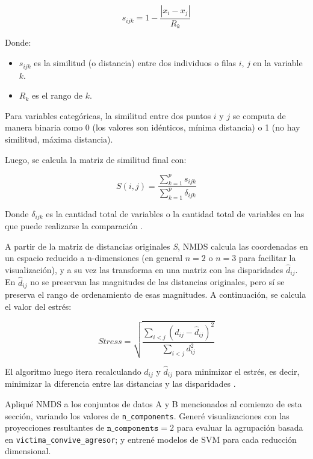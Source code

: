 \documentclass[10 pt]{article}
\begin{document}
\[s_{ijk} = 1-\frac{|x_{i} - x_{j}|}{R_{k}}\]

Donde:
\begin{itemize}
    \item \(s_{ijk}\) es la similitud (o distancia) entre dos individuos o filas \(i\), \(j\) en la variable \(k\).
    \item \(R_{k}\) es el rango de \(k\).
\end{itemize}

Para variables categóricas, la similitud entre dos puntos \(i\) y \(j\) se computa de manera binaria como 0 (los valores son idénticos, mínima distancia) o 1 (no hay similitud, máxima distancia).

Luego, se calcula la matriz de similitud final con:

\[S(i,j) = \frac{\sum_{k=1}^{p}  s_{ijk}}{\sum_{k=1}^{p} \delta_{ijk}}\]

Donde \(\delta_{ijk}\) es la cantidad total de variables o la cantidad total de variables en las que puede realizarse la comparación \citetext{\citealp[p. 859-860]{gower1971general}}.

 

A partir de la matriz de distancias originales \textit{S}, NMDS calcula las coordenadas en un espacio reducido a n-dimensiones (en general \(n=2\) o \(n=3\) para facilitar la visualización), %
y a su vez las transforma en una matriz con las disparidades \(\hat{d}_{ij}\). En \(\hat{d}_{ij}\) no se preservan las magnitudes de las distancias originales, pero sí se preserva el rango de ordenamiento de esas magnitudes. %
A continuación, se calcula el valor del estrés: 

\[\textit{Stress} = \sqrt{\frac{\sum_{i<j} \left( d_{ij} - \hat{d}_{ij} \right)^2}{\sum_{i<j} d_{ij}^2}}\]

El algoritmo luego itera recalculando \(d_{ij}\) y \(\hat{d}_{ij}\) para minimizar el estrés, es decir, minimizar la diferencia entre las distancias y las disparidades \citetext{\citealp[p. 117-123]{kruskal1964nonmetric}}. 

Apliqué NMDS a los conjuntos de datos A y B mencionados al comienzo de esta sección, variando los valores de \texttt{n\_components}. Generé visualizaciones con las proyecciones resultantes de \(\texttt{n\_components} = 2\) para evaluar la agrupación basada en \texttt{victima\_convive\_agresor}; y entrené modelos de SVM para cada reducción dimensional.
\end{document}
